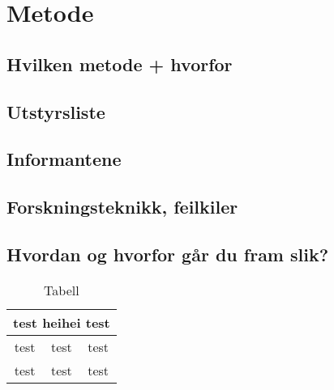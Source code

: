 \section{Metode}

\subsection{Hvilken metode + hvorfor}

\subsection{Utstyrsliste}

\subsection{Informantene}

\subsection{Forskningsteknikk, feilkiler}

\subsection{Hvordan og hvorfor går du fram slik?}

\begin{table}[h]
    \begin{center}
        \begin{tabular}{|c|c|c|}
            \hline
            \multicolumn{3}{|c|}{test heihei test}\\
            \hline\hline
            test & test & test \\
            \hline
            test & test & test \\
            \hline
        \end{tabular}
        \caption{Tabell}
    \end{center}
\end{table}

\newpage